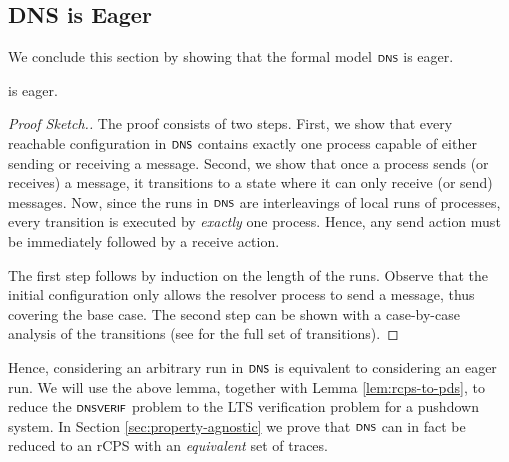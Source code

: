 \subsection{DNS is Eager}

We conclude this section by showing that the formal model $\scrsf{dns}$ is eager.

\begin{lemma}\label{lem:eager-dns}
	 is eager.
\end{lemma}
\begin{proof}[Proof Sketch.]
    The proof consists of two steps.
    First,
    we show that every reachable configuration in $\scrsf{dns}$ contains exactly one process capable of either sending or receiving a message. 
    Second,
    we show that once a process sends (or receives) a message, it transitions to a state where it can only receive (or send) messages. 
    Now, since the runs in $\scrsf{dns}$ are interleavings of local runs of processes, every transition is executed by \emph{exactly} one process. Hence, any send action must be immediately followed by a receive action.

    The first step follows by induction on the length of the runs. Observe that the initial configuration only allows the resolver process to send a message, thus covering the base case. The second step can be shown with a case-by-case analysis of the transitions (see \cite[Appendix A]{tech-rpt} for the full set of transitions).
\end{proof}

Hence, considering an arbitrary run in $\scrsf{dns}$ is equivalent to considering an eager run. We will use the above lemma, together with Lemma \ref{lem:rcps-to-pds}, to reduce the $\verif$ problem to the LTS verification problem for a pushdown system. In Section \ref{sec:property-agnostic} we prove that $\scrsf{dns}$ can in fact be reduced to an rCPS with an \emph{equivalent} set of traces.
